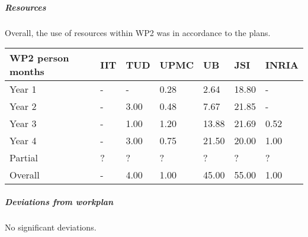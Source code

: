 \subparagraph*{Resources}
Overall, the use of resources within WP2 was in accordance to the plans. 

\begin{center}
\begin{tabular}{|C{1.5cm}|C{1.5cm}|C{1.5cm}|C{2cm}|C{2cm}|C{2cm}|C{2cm}|}
\hline
\footnotesize \textbf{WP2 person months}& \footnotesize \textbf{IIT}&\footnotesize \textbf{TUD}&\footnotesize \textbf{UPMC}& \footnotesize \textbf{UB} &\footnotesize \textbf{JSI} & \footnotesize \textbf{INRIA} \\ \hline
\footnotesize Year 1  &  -     & -    & 0.28 & 2.64  & 18.80  & -     \\  \hline
\footnotesize Year 2  &  -     & 3.00 & 0.48 & 7.67  & 21.85  & -     \\  \hline
\footnotesize Year 3  &  -     & 1.00 & 1.20 & 13.88 & 21.69  & 0.52  \\  \hline
\footnotesize Year 4  &  -     & 3.00 & 0.75 & 21.50 & 20.00  & 1.00  \\  \hline 
\footnotesize Partial & ?      & ?    & ?    & ?     & ?      & ?     \\
\hline \hline
\footnotesize Overall & -      & 4.00 & 1.00 & 45.00  & 55.00 & 1.00  \\  \hline
\end{tabular}
\end{center}

\subparagraph*{Deviations from workplan} 
No significant deviations.
